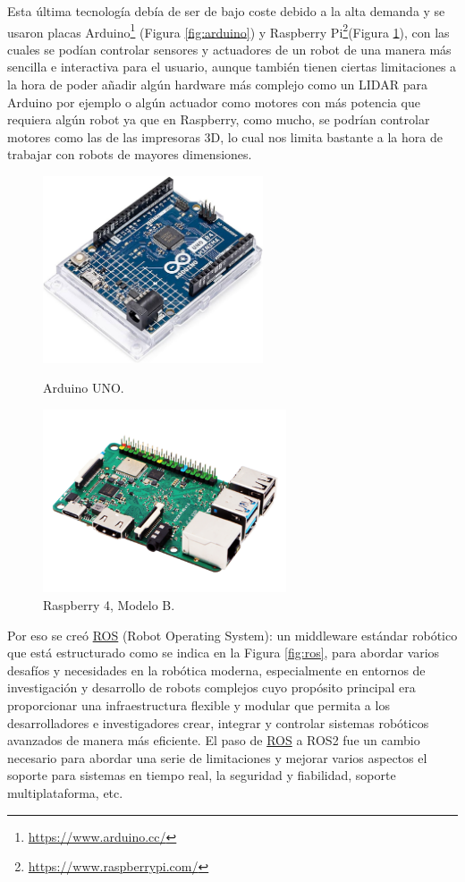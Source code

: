 Esta última tecnología debía de ser de bajo coste debido a la alta demanda y se usaron placas Arduino\footnote{\url{https://www.arduino.cc/}} (Figura \ref{fig:arduino}) y Raspberry Pi\footnote{\url{https://www.raspberrypi.com/}}(Figura \ref{fig:raspberry}), con las cuales se podían controlar sensores y actuadores de un robot de una manera más sencilla e interactiva para el usuario, aunque también tienen ciertas limitaciones a la hora de poder añadir algún hardware más complejo como un LIDAR para Arduino por ejemplo o algún actuador como motores con más potencia que requiera algún robot ya que en Raspberry, como mucho, se podrían controlar motores como las de las impresoras 3D, lo cual nos limita bastante a la hora de trabajar con robots de mayores dimensiones.


\begin{figure}[H]
  \begin{minipage}{0.48\textwidth}
    \centering
    \includegraphics[width=6.5cm]{figs/arduino_uno.jpg}
    \caption{Arduino UNO.}
    \label{fig:arduino}
  \end{minipage}
  \hfill
  \begin{minipage}{0.48\textwidth}
    \centering
    \includegraphics[width=7.2cm]{figs/raspberry4.png}
    \caption{Raspberry 4, Modelo B.} 
    \label{fig:raspberry}
  \end{minipage}
\end{figure}

Por eso se creó \hyperlink{ROS}{ROS} (Robot Operating System): un middleware estándar robótico que está estructurado como se indica en la Figura \ref{fig:ros}, para abordar varios desafíos y necesidades en la robótica moderna, especialmente en entornos de investigación y desarrollo de robots complejos cuyo propósito principal era proporcionar una infraestructura flexible y modular que permita a los desarrolladores e investigadores crear, integrar y controlar sistemas robóticos avanzados de manera más eficiente. El paso de \hyperlink{ROS}{ROS} a ROS2 fue un cambio necesario para abordar una serie de limitaciones y mejorar varios aspectos el soporte para sistemas en tiempo real, la seguridad y fiabilidad, soporte multiplataforma, etc.


